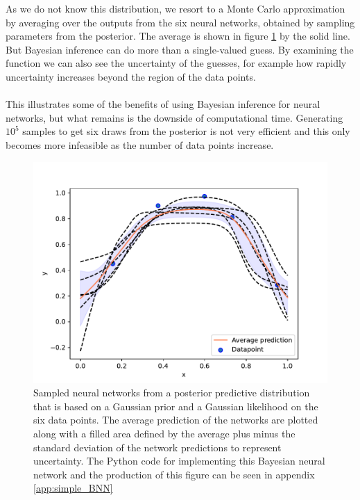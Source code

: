 As we do not know this distribution, we resort to a Monte Carlo approximation by averaging over the outputs from the six neural networks, obtained by sampling parameters from the posterior. The average is shown in figure \ref{fig:simple_BNN} by the solid line. But Bayesian inference can do more than a single-valued guess. By examining the function we can also see the uncertainty of the guesses, for example how rapidly uncertainty increases beyond the region of the data points. 
\\
\\
This illustrates some of the benefits of using Bayesian inference for neural networks, but what remains is the downside of computational time. Generating $10^5$ samples to get six draws from the posterior is not very efficient and this only becomes more infeasible as the number of data points increase. 
\begin{figure}
    \centering
    \includegraphics[width=\textwidth,height=\textheight,keepaspectratio]{pics/figure_simple_BNN.pdf}
    \caption{Sampled neural networks from a posterior predictive distribution that is based on a Gaussian prior and a Gaussian likelihood on the six data points. The average prediction of the networks are plotted along with a filled area defined by the average plus minus the standard deviation of the network predictions to represent uncertainty. The Python code for implementing this Bayesian neural network and the production of this figure can be seen in appendix \ref{app:simple_BNN}}
    \label{fig:simple_BNN}
\end{figure}
\clearpage
